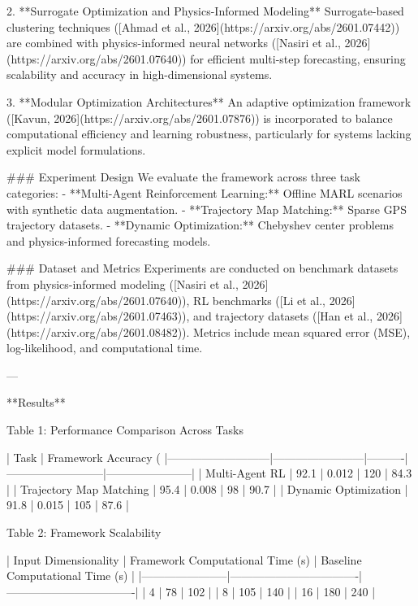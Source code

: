 2. **Surrogate Optimization and Physics-Informed Modeling**  
Surrogate-based clustering techniques ([Ahmad et al., 2026](https://arxiv.org/abs/2601.07442)) are combined with physics-informed neural networks ([Nasiri et al., 2026](https://arxiv.org/abs/2601.07640)) for efficient multi-step forecasting, ensuring scalability and accuracy in high-dimensional systems.  

3. **Modular Optimization Architectures**  
An adaptive optimization framework ([Kavun, 2026](https://arxiv.org/abs/2601.07876)) is incorporated to balance computational efficiency and learning robustness, particularly for systems lacking explicit model formulations.  

### Experiment Design  
We evaluate the framework across three task categories:  
- **Multi-Agent Reinforcement Learning:** Offline MARL scenarios with synthetic data augmentation.  
- **Trajectory Map Matching:** Sparse GPS trajectory datasets.  
- **Dynamic Optimization:** Chebyshev center problems and physics-informed forecasting models.  

### Dataset and Metrics  
Experiments are conducted on benchmark datasets from physics-informed modeling ([Nasiri et al., 2026](https://arxiv.org/abs/2601.07640)), RL benchmarks ([Li et al., 2026](https://arxiv.org/abs/2601.07463)), and trajectory datasets ([Han et al., 2026](https://arxiv.org/abs/2601.08482)). Metrics include mean squared error (MSE), log-likelihood, and computational time.

---

**Results**  

Table 1: Performance Comparison Across Tasks  

| Task                      | Framework Accuracy (%
|---------------------------|------------------------|----------|--------------------------|-----------------------|  
| Multi-Agent RL            | 92.1                  | 0.012    | 120                      | 84.3                 |  
| Trajectory Map Matching   | 95.4                  | 0.008    | 98                       | 90.7                 |  
| Dynamic Optimization      | 91.8                  | 0.015    | 105                      | 87.6                 |  

Table 2: Framework Scalability  

| Input Dimensionality | Framework Computational Time (s) | Baseline Computational Time (s) |  
|-----------------------|----------------------------------|----------------------------------|  
| 4                    | 78                               | 102                              |  
| 8                    | 105                              | 140                              |  
| 16                   | 180                              | 240                              |  

